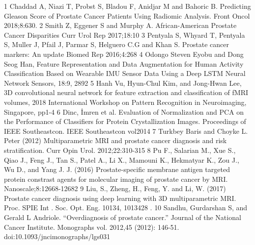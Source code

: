 \documentclass[11pt]{article}
\begin{document}
\vspace{3mm}
\begin{footnotesize}

\begin{thebibliography}
{1} 
  Chaddad A, Niazi T, Probst S, Bladou F, Anidjar M and Bahoric B. Predicting Gleason Score of Prostate Cancer Patients Using Radiomic Analysis.
Front Oncol 2018;8:630. 
{2}
 Smith Z, Eggener S and Murphy A. African-American Prostate Cancer Disparities
Curr Urol Rep 2017;18:10
{3}
 Pentyala S, Whyard T, Pentyala S, Muller J, Pfail J, Parmar S, Helguero C.G and Khan S. Prostate cancer markers: An update
Biomed Rep 2016;4:268
{4}
 Odongo Steven Eyobu and Dong Seog Han, Feature Representation and Data Augmentation for Human Activity Classification Based on Wearable IMU Sensor Data Using a Deep LSTM Neural Network Sensors, 18:9, 2892
{5}
 Hanh Vu, Hyun-Chul Kim, and Jong-Hwan Lee, 3D convolutional neural network for feature extraction and classification of fMRI volumes, 2018 International Workshop on Pattern Recognition in Neuroimaging, Singapore, pp1-4 
{6}
 Dinc, İmren et al. Evaluation of Normalization and PCA on the Performance of Classifiers for Protein Crystallization Images. Proceedings of IEEE Southeastcon. IEEE Southeastcon vol2014
{7}
 Turkbey Baris and Choyke L. Peter (2012) Multiparametric MRI and prostate cancer diagnosis and risk stratification. Curr Opin Urol. 2012;22:310-315
{8}
 Pu F., Salarian M., Xue S., Qiao J., Feng J., Tan S., Patel A., Li X., Mamouni K., Hekmatyar K., Zou J., Wu D., and Yang J. J. (2016) Prostate-specific membrane antigen targeted protein constrast agents for molecular imaging of prostate cancer by MRI. Nanoscale;8:12668-12682
{9}
Liu, S., Zheng, H., Feng, Y. and Li, W. (2017) Prostate cancer diagnosis using deep learning with 3D multiparametric MRI. Proc. SPIE Int . Soc. Opt. Eng. 10134, 1013428 .
{10}
Sandhu, Gurdarshan S, and Gerald L Andriole. “Overdiagnosis of prostate cancer.” Journal of the National Cancer Institute. Monographs vol. 2012,45 (2012): 146-51. doi:10.1093/jncimonographs/lgs031
\end{thebibliography}
\end{footnotesize}

\end{document}
